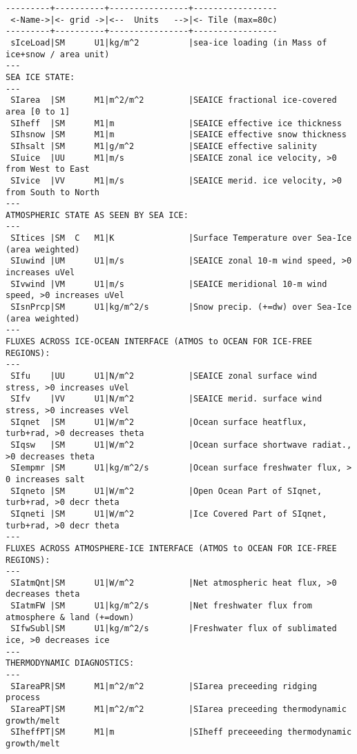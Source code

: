 \begin{table}[!ht]
\centering
\label{tab:pkg:seaice:diagnostics}
{\footnotesize
\begin{verbatim}
---------+----------+----------------+-----------------
 <-Name->|<- grid ->|<--  Units   -->|<- Tile (max=80c)
---------+----------+----------------+-----------------
 sIceLoad|SM      U1|kg/m^2          |sea-ice loading (in Mass of ice+snow / area unit)
---
SEA ICE STATE:
---
 SIarea  |SM      M1|m^2/m^2         |SEAICE fractional ice-covered area [0 to 1]
 SIheff  |SM      M1|m               |SEAICE effective ice thickness
 SIhsnow |SM      M1|m               |SEAICE effective snow thickness
 SIhsalt |SM      M1|g/m^2           |SEAICE effective salinity
 SIuice  |UU      M1|m/s             |SEAICE zonal ice velocity, >0 from West to East
 SIvice  |VV      M1|m/s             |SEAICE merid. ice velocity, >0 from South to North
---
ATMOSPHERIC STATE AS SEEN BY SEA ICE:
---
 SItices |SM  C   M1|K               |Surface Temperature over Sea-Ice (area weighted)
 SIuwind |UM      U1|m/s             |SEAICE zonal 10-m wind speed, >0 increases uVel
 SIvwind |VM      U1|m/s             |SEAICE meridional 10-m wind speed, >0 increases uVel
 SIsnPrcp|SM      U1|kg/m^2/s        |Snow precip. (+=dw) over Sea-Ice (area weighted)
---
FLUXES ACROSS ICE-OCEAN INTERFACE (ATMOS to OCEAN FOR ICE-FREE REGIONS):
---
 SIfu    |UU      U1|N/m^2           |SEAICE zonal surface wind stress, >0 increases uVel
 SIfv    |VV      U1|N/m^2           |SEAICE merid. surface wind stress, >0 increases vVel
 SIqnet  |SM      U1|W/m^2           |Ocean surface heatflux, turb+rad, >0 decreases theta
 SIqsw   |SM      U1|W/m^2           |Ocean surface shortwave radiat., >0 decreases theta
 SIempmr |SM      U1|kg/m^2/s        |Ocean surface freshwater flux, > 0 increases salt
 SIqneto |SM      U1|W/m^2           |Open Ocean Part of SIqnet, turb+rad, >0 decr theta
 SIqneti |SM      U1|W/m^2           |Ice Covered Part of SIqnet, turb+rad, >0 decr theta
---
FLUXES ACROSS ATMOSPHERE-ICE INTERFACE (ATMOS to OCEAN FOR ICE-FREE REGIONS):
---
 SIatmQnt|SM      U1|W/m^2           |Net atmospheric heat flux, >0 decreases theta
 SIatmFW |SM      U1|kg/m^2/s        |Net freshwater flux from atmosphere & land (+=down)
 SIfwSubl|SM      U1|kg/m^2/s        |Freshwater flux of sublimated ice, >0 decreases ice
---
THERMODYNAMIC DIAGNOSTICS:
---
 SIareaPR|SM      M1|m^2/m^2         |SIarea preceeding ridging process
 SIareaPT|SM      M1|m^2/m^2         |SIarea preceeding thermodynamic growth/melt
 SIheffPT|SM      M1|m               |SIheff preceeeding thermodynamic growth/melt

\end{verbatim}}
\end{table}
